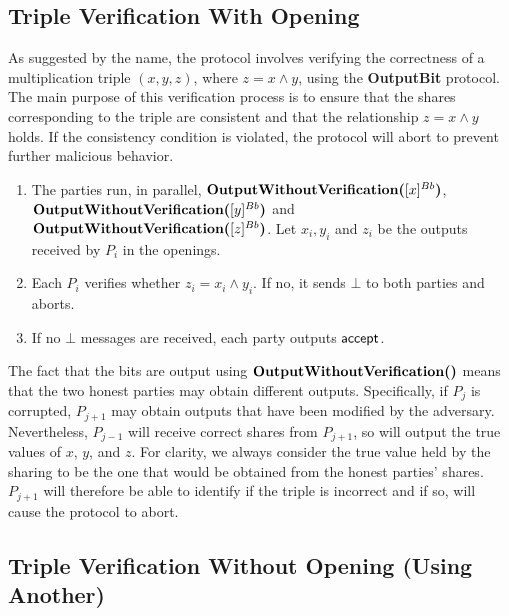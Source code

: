 \subsection{Triple Verification With Opening}

As suggested by the name, the protocol involves verifying the correctness of a multiplication triple $(x, y, z)$, where $z = x \wedge y$, using the {\bf OutputBit} protocol.
The main purpose of this verification process is to ensure that the shares corresponding to the triple are consistent and that the relationship $z = x \wedge y$ holds.
If the consistency condition is violated, the protocol will abort to prevent further malicious behavior.

\begin{protocol}
    \label{protocol:trip_with_open}
    \begin{enumerate}
        \item The parties run, in parallel, 
		$\textbf{OutputWithoutVerification(}[x]^{Bb}\textbf{)}$, 
		$\textbf{OutputWithoutVerification(}[y]^{Bb}\textbf{)}$ and 
		    \\ $\textbf{OutputWithoutVerification(}[z]^{Bb}\textbf{)}$. Let $x_i, y_i$ and $z_i$ be the outputs received by $P_i$ in the openings.
        \item Each $P_i$ verifies whether $z_i = x_i \wedge y_i$. If no, it sends $\bot$ to both parties and aborts.
        \item If no $\bot$ messages are received, each party outputs $\mathsf{accept}$.
    \end{enumerate}
\end{protocol}

The fact that the bits are output using $\textbf{OutputWithoutVerification(}\textbf{)}$
means that the two honest parties may obtain different outputs.
Specifically, if $P_j$ is corrupted, $P_{j+1}$ may obtain outputs that have been
modified by the adversary.
Nevertheless, $P_{j-1}$ will receive correct shares from $P_{j+1}$, 
so will output the true values of $x$, $y$, and $z$.
For clarity, we always consider the true value held by the sharing to be the one
that would be obtained from the honest parties' shares.
$P_{j+1}$ will therefore be able to identify if the triple is incorrect and if so,
will cause the protocol to abort.

\subsection{Triple Verification Without Opening (Using Another)}

